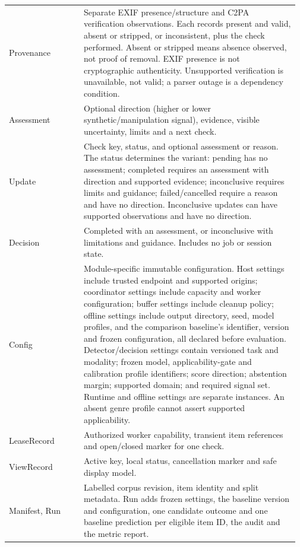 \documentclass[12pt, titlepage]{article}
\newcommand{\ty}[1]{\textsf{#1}}
\begin{document}
\begin{longtable}{@{}p{0.25\linewidth}p{0.72\linewidth}@{}}
\ty{Provenance} & Separate EXIF presence/structure and C2PA verification observations. Each records present and valid, absent or stripped, or inconsistent, plus the check performed. Absent or stripped means absence observed, not proof of removal. EXIF presence is not cryptographic authenticity. Unsupported verification is unavailable, not valid; a parser outage is a dependency condition. \\
\ty{Assessment} & Optional direction (higher or lower synthetic/manipulation signal), evidence, visible uncertainty, limits and a next check. \\
\ty{Update} & Check key, status, and optional assessment or reason. The status determines the variant: pending has no assessment; completed requires an assessment with direction and supported evidence; inconclusive requires limits and guidance; failed/cancelled require a reason and have no direction. Inconclusive updates can have supported observations and have no direction. \\
\ty{Decision} & Completed with an assessment, or inconclusive with limitations and guidance. Includes no job or session state. \\
\ty{Config} & Module-specific immutable configuration. Host settings include trusted endpoint and supported origins; coordinator settings include capacity and worker configuration; buffer settings include cleanup policy; offline settings include output directory, seed, model profiles, and the comparison baseline's identifier, version and frozen configuration, all declared before evaluation. Detector/decision settings contain versioned task and modality; frozen model, applicability-gate and calibration profile identifiers; score direction; abstention margin; supported domain; and required signal set. Runtime and offline settings are separate instances. An absent genre profile cannot assert supported applicability. \\
\ty{LeaseRecord} & Authorized worker capability, transient item references and open/closed marker for one check. \\
\ty{ViewRecord} & Active key, local status, cancellation marker and safe display model. \\
\ty{Manifest}, \ty{Run} & Labelled corpus revision, item identity and split metadata. Run adds frozen settings, the baseline version and configuration, one candidate outcome and one baseline prediction per eligible item ID, the audit and the metric report. \\
\bottomrule
\end{longtable}
\end{document}
